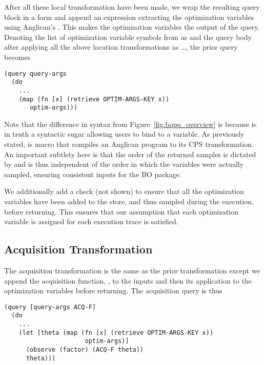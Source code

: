 After all these local transformation have been made, we wrap the resulting query block in a  form and append an expression extracting the optimization variables using Anglican's .  This makes the optimization variables the output of the query.  Denoting the list of optimization variable symbols from  as  and the query body after applying all the above location transformations as \dots, the prior query becomes
    \begin{lstlisting}[basicstyle=\footnotesize\ttfamily]
(query query-args
  (do
    ...
    (map (fn [x] (retrieve OPTIM-ARGS-KEY x))
       optim-args)))
    \end{lstlisting}
Note that the difference in syntax from Figure~\ref{fig:bopp_overview} is because  is in truth a syntactic sugar allowing users to bind  to a variable.  As previously stated,  is macro that compiles an Anglican program to its CPS transformation.  An important subtlety here is that the order of the returned samples is dictated by  and is thus independent of the order in which the variables were actually sampled, ensuring consistent inputs for the BO package.

We additionally add a check (not shown) to ensure that all the optimization variables have been added to the store, and thus sampled during the execution, before returning.  This ensures that our assumption that each optimization variable is assigned for each execution trace is satisfied.

\subsection{Acquisition Transformation}
\label{sec:bopp-supp/acq-transformations}
The acquisition transformation is the same as the prior transformation except we append the acquisition function, , to the inputs and then \observe its application to the optimization variables before returning.
The acquisition query is thus
    \begin{lstlisting}[basicstyle=\footnotesize\ttfamily]
(query [query-args ACQ-F]
  (do
    ...
    (let [theta (map (fn [x] (retrieve OPTIM-ARGS-KEY x))
                      optim-args)]
      (observe (factor) (ACQ-F theta))
      theta)))
    \end{lstlisting}

